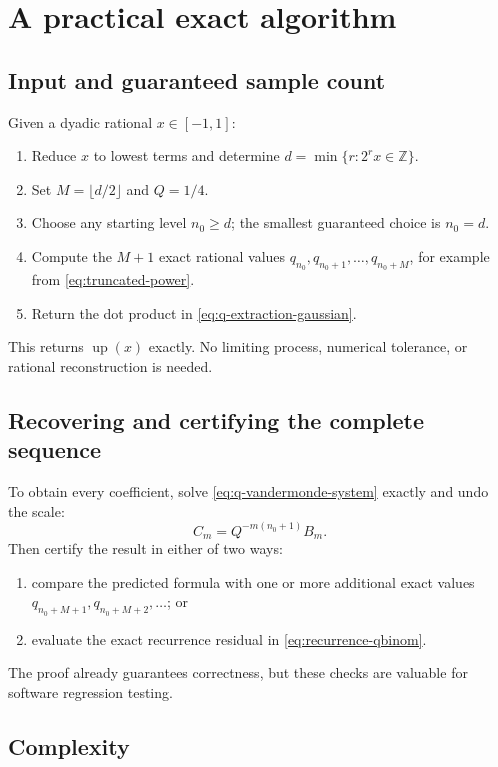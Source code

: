 \documentclass[11pt]{article}
\newcommand{\Z}{\mathbb{Z}}
\newcommand{\upf}{\operatorname{up}}
\begin{document}
\section{A practical exact algorithm}

\subsection{Input and guaranteed sample count}

Given a dyadic rational \(x\in[-1,1]\):
\begin{enumerate}[leftmargin=2.2em]
\item Reduce \(x\) to lowest terms and determine
      \(d=\min\{r:2^rx\in\Z\}\).
\item Set \(M=\lfloor d/2\rfloor\) and \(Q=1/4\).
\item Choose any starting level \(n_0\ge d\); the smallest guaranteed choice is
      \(n_0=d\).
\item Compute the \(M+1\) exact rational values
      \(q_{n_0},q_{n_0+1},\ldots,q_{n_0+M}\), for example from
      \cref{eq:truncated-power}.
\item Return the dot product in \cref{eq:q-extraction-gaussian}.
\end{enumerate}
This returns \(\upf(x)\) exactly.  No limiting process, numerical tolerance, or
rational reconstruction is needed.

\subsection{Recovering and certifying the complete sequence}

To obtain every coefficient, solve \cref{eq:q-vandermonde-system} exactly and
undo the scale:
\[
 C_m=Q^{-m(n_0+1)}B_m.
\]
Then certify the result in either of two ways:
\begin{enumerate}[leftmargin=2.2em]
\item compare the predicted formula with one or more additional exact values
      \(q_{n_0+M+1},q_{n_0+M+2},\ldots\); or
\item evaluate the exact recurrence residual in
      \cref{eq:recurrence-qbinom}.
\end{enumerate}
The proof already guarantees correctness, but these checks are valuable for
software regression testing.

\subsection{Complexity}
\end{document}

